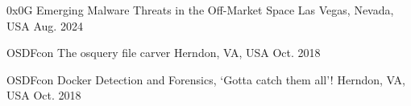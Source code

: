 


\begin{cvhonors}


\cvhonor
{0x0G} %
{Emerging Malware Threats in the Off-Market Space} %
{Las Vegas, Nevada, USA} %
{Aug. 2024} %


\cvhonor
{OSDFcon} %
{The osquery file carver} %
{Herndon, VA, USA} %
{Oct. 2018} %


\cvhonor
{OSDFcon} %
{Docker Detection and Forensics, ‘Gotta catch them all’!} %
{Herndon, VA, USA} %
{Oct. 2018} %


\end{cvhonors}
